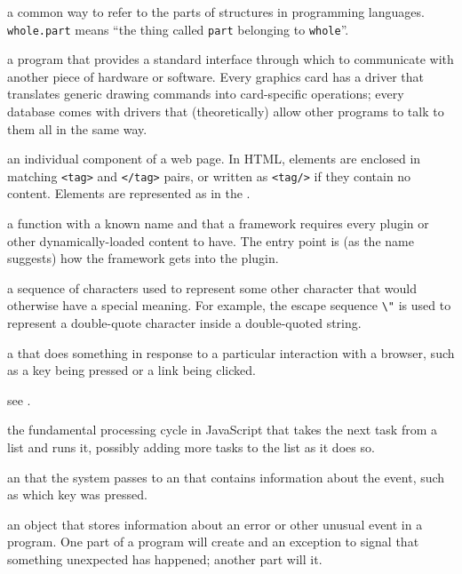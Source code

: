 \begin{description}
a common way to refer to the parts of structures in programming languages.
\texttt{whole.part} means ``the thing called \texttt{part} belonging to \texttt{whole}''.

a program that provides a standard interface through which to communicate with
another piece of hardware or software. Every graphics card has a driver that
translates generic drawing commands into card-specific operations; every
database comes with drivers that (theoretically) allow other programs to talk
to them all in the same way.

an individual component of a web page. In HTML, elements are enclosed in
matching \texttt{\textless{}tag\textgreater{}} and \texttt{\textless{}/tag\textgreater{}} pairs, or written as \texttt{\textless{}tag/\textgreater{}} if they contain no
content. Elements are represented as  in the .

a function with a known name and  that a framework
requires every plugin or other dynamically-loaded content to have. The entry
point is (as the name suggests) how the framework gets into the plugin.

a sequence of characters used to represent some other character that would
otherwise have a special meaning. For example, the escape sequence \texttt{\textbackslash{}"} is
used to represent a double-quote character inside a double-quoted string.

a  that does something in response to
a particular interaction with a browser, such as a key being pressed or a link
being clicked.

see .

the fundamental processing cycle in JavaScript that takes the next task from a
list and runs it, possibly adding more tasks to the list as it does so.

an  that the system passes to an  that contains information about the event, such as
which key was pressed.

an object that stores information about an error or other unusual event in a
program. One part of a program will create and  an exception
to signal that something unexpected has happened; another part will
 it.


\end{description}
